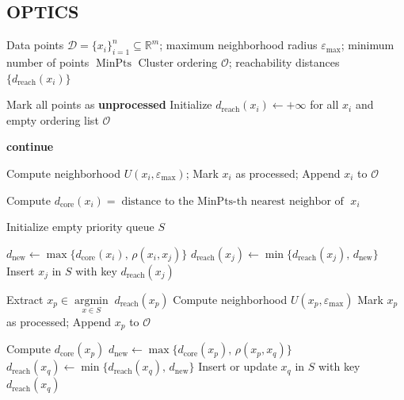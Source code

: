 \subsection{OPTICS}
\begin{algorithm}[H]
	\caption{OPTICS (Ordering Points To Identify the Clustering Structure)}
	\label{alg:OPTICS}
	\begin{algorithmic}[1]
		\Require Data points $\mathcal{D}=\{x_i\}_{i=1}^{n}\subseteq\mathbb{R}^m$;
		maximum neighborhood radius $\varepsilon_{\max}$;
		minimum number of points $\operatorname{MinPts}$
		\Ensure Cluster ordering $\mathcal{O}$;
		reachability distances $\{d_{\text{reach}}(x_i)\}$
		
		\State Mark all points as \textbf{unprocessed}
		\State Initialize $d_{\text{reach}}(x_i)\gets +\infty$ for all $x_i$ and empty ordering list $\mathcal{O}$
		
		\State \textbf{continue}
		\EndIf
		
		\State Compute neighborhood $U(x_i,\varepsilon_{\max})$; Mark $x_i$ as processed; Append $x_i$ to $\mathcal{O}$
		
		\State Compute $d_{\text{core}}(x_i)=\text{distance to the $\operatorname{MinPts}$-th nearest neighbor of }x_i$
		
		\State Initialize empty priority queue $S$
		
		\State $d_{\text{new}}
		\gets \max\{d_{\text{core}}(x_i),\,\rho(x_i,x_j)\}$
		\State $d_{\text{reach}}(x_j)
		\gets \min\{d_{\text{reach}}(x_j),\,d_{\text{new}}\}$
		\State Insert $x_j$ in $S$ with key $d_{\text{reach}}(x_j)$
		\EndFor
		
		\State Extract $x_p\in\operatorname{\arg\min}\limits_{x\in S}\;d_{\text{reach}}(x_p)$
		\State Compute neighborhood $U(x_p,\varepsilon_{\max})$
		\State Mark $x_p$ as processed; Append $x_p$ to $\mathcal{O}$
		
		\State Compute $d_{\text{core}}(x_p)$
		\State $d_{\text{new}}
		\gets \max\{d_{\text{core}}(x_p),\,\rho(x_p,x_q)\}$
		\State $d_{\text{reach}}(x_q)
		\gets \min\{d_{\text{reach}}(x_q),\,d_{\text{new}}\}$
		\State Insert or update $x_q$ in $S$ with key $d_{\text{reach}}(x_q)$
		\EndFor
		\EndIf
		\EndWhile
		\EndIf
		\EndFor
	\end{algorithmic}
\end{algorithm}

